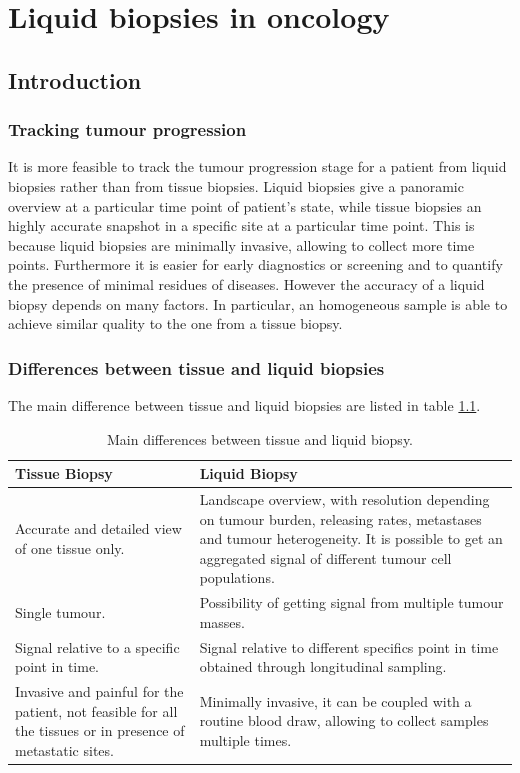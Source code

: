 \graphicspath{{chapters/notes/08/images/}}
\chapter{Liquid biopsies in oncology}

\section{Introduction}

    \subsection{Tracking tumour progression}
    It is more feasible to track the tumour progression stage for a patient from liquid biopsies rather than from tissue biopsies.
    Liquid biopsies give a panoramic overview at a particular time point of patient's state, while tissue biopsies an highly accurate snapshot in a specific site at a particular time point.
    This is because liquid biopsies are minimally invasive, allowing to collect more time points.
    Furthermore it is easier for early diagnostics or screening and to quantify the presence of minimal residues of diseases.
    However the accuracy of a liquid biopsy depends on many factors.
    In particular, an homogeneous sample is able to achieve similar quality to the one from a tissue biopsy.

    \subsection{Differences between tissue and liquid biopsies}
    The main difference between tissue and liquid biopsies are listed in table \ref{tab:diff1}.

    \begin{table}[H]
        \centering
        \begin{tabular}{ | p{4cm} | p{9cm} | }
             \hline
             Tissue Biopsy & Liquid Biopsy \\
             \hline
             Accurate and detailed view of one tissue only. & Landscape overview, with resolution depending on tumour burden, releasing rates, metastases and tumour heterogeneity. It is possible to get an aggregated signal of different tumour cell populations. \\
             \hline
             Single tumour. & Possibility of getting signal from multiple tumour masses.\\
             \hline
             Signal relative to a specific point in time. & Signal relative to different specifics point in time obtained through longitudinal sampling.\\
             \hline
             Invasive and painful for the patient, not feasible for all the tissues or in presence of metastatic sites. & Minimally invasive, it can be coupled with a routine blood draw, allowing to collect samples multiple times.\\
             \hline
        \end{tabular}
        \caption{Main differences between tissue and liquid biopsy.}
        \label{tab:diff1}
    \end{table}

